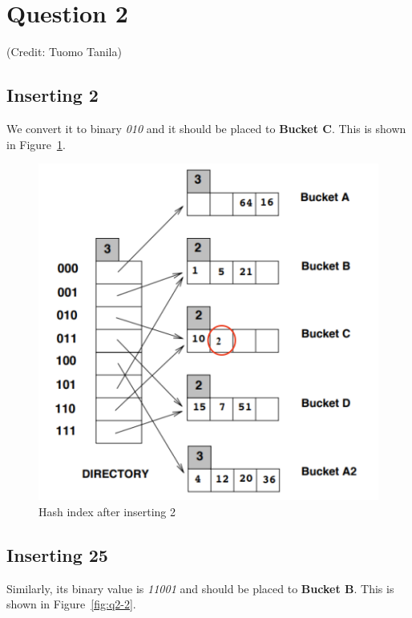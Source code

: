 \section{Question 2}\label{question-2}

(Credit: Tuomo Tanila)

\subsection{Inserting 2}

We convert it to binary \textit{010} and it should be placed to \textbf{Bucket C}. This is shown in Figure~\ref{fig:q2-1}.

\begin{figure}[H]
  \centering
  \includegraphics[width=0.9\linewidth]{figs/q2-1.png}
  \caption{Hash index after inserting 2}
  \label{fig:q2-1}
\end{figure}

\subsection{Inserting 25}

Similarly, its binary value is \textit{11001} and should be placed to \textbf{Bucket B}. This is shown in Figure~\ref{fig:q2-2}.

